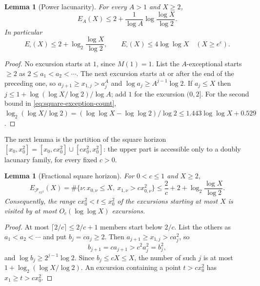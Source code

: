 \documentclass[11pt]{amsart}
\numberwithin{equation}{section}
\theoremstyle{plain}
\newtheorem{lemma}[theorem]{Lemma}
\theoremstyle{definition}
\theoremstyle{remark}
\newcommand{\F}{\mathcal{F}}
\begin{document}
\begin{lemma}[Power lacunarity]
\label{lem:power-lacunary}
For every $A>1$ and $X\ge2$,
\begin{equation}
\label{eq:power-lacunary-count}
E_A(X)\le2+\frac1{\log A}\log\frac{\log X}{\log2}.
\end{equation}
In particular
\begin{equation}
\label{eq:square-exception-count}
E_\square(X)\le2+\log_2\frac{\log X}{\log2},\qquad
E_\square(X)\le4\log\log X\quad(X\ge e^e).
\end{equation}
\end{lemma}

\begin{proof}
No excursion starts at $1$, since $M(1)=1$. List the $A$-exceptional starts
$\ge2$ as $2\le a_1<a_2<\cdots$. The next excursion starts at or after the
end of the preceding one, so $a_{j+1}\ge x_{1,j}>a_j^A$ and
$\log a_j\ge A^{j-1}\log2$. If $a_j\le X$ then
$j\le1+\log(\log X/\log2)/\log A$; add $1$ for the excursion $(0,2]$. For the
second bound in \eqref{eq:square-exception-count},
$\log_2(\log X/\log2)=(\log\log X-\log\log2)/\log2\le1.443\log\log X+0.529$.
\end{proof}

The next lemma is the partition of the square horizon
$[x_0,x_0^2]=[x_0,cx_0^2]\cup[cx_0^2,x_0^2]$: the upper part is accessible
only to a doubly lacunary family, for every fixed $c>0$.

\begin{lemma}[Fractional square horizon]
\label{lem:partition}
For $0<c\le1$ and $X\ge2$,
\begin{equation}
\label{eq:partition-count}
E_{\F_{cx^2}}(X)=\#\{\nu:x_{0,\nu}\le X,\ x_{1,\nu}>cx_{0,\nu}^2\}
\le\frac2c+2+\log_2\frac{\log X}{\log2}.
\end{equation}
Consequently, the range $cx_0^2<t\le x_0^2$ of the excursions starting at
most $X$ is visited by at most $O_c(\log\log X)$ excursions.
\end{lemma}

\begin{proof}
At most $\lceil2/c\rceil\le2/c+1$ members start below $2/c$. List the others
as $a_1<a_2<\cdots$ and put $b_j=ca_j\ge2$. Then
$a_{j+1}\ge x_{1,j}>ca_j^2$, so
\[
b_{j+1}=ca_{j+1}>c^2a_j^2=b_j^2,
\]
and $\log b_j\ge2^{j-1}\log2$. Since $b_j\le cX\le X$, the number of such
$j$ is at most $1+\log_2(\log X/\log2)$. An excursion containing a point
$t>cx_0^2$ has $x_1\ge t>cx_0^2$.
\end{proof}
\end{document}
